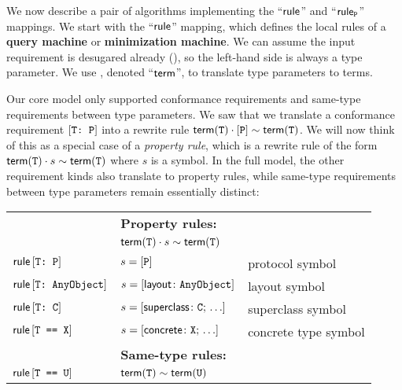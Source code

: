 \documentclass[../generics]{subfiles}
\begin{document}
We now describe a pair of algorithms implementing the ``$\mathsf{rule}$'' and ``$\mathsf{rule}_{\texttt{P}}$'' mappings. We start with the ``$\mathsf{rule}$'' mapping, which defines the local rules of a \textbf{query machine} or \textbf{minimization machine}. We can assume the input requirement is desugared already (), so the left-hand side is always a type parameter. We use , denoted ``$\mathsf{term}$'', to translate type parameters to terms.

Our core model only supported conformance requirements and same-type requirements between type parameters. We saw that we translate a conformance requirement $[\texttt{T:~P}]$ into a rewrite rule $\mathsf{term}(\texttt{T}) \cdot [\texttt{P}] \sim \mathsf{term}(\texttt{T})$. We will now think of this as a special case of a \emph{property rule}, which is a rewrite rule of the form $\mathsf{term}(\texttt{T}) \cdot s \sim \mathsf{term}(\texttt{T})$ where $s$ is a symbol. In the full model, the other requirement kinds also translate to property rules, while same-type requirements between type parameters remain essentially distinct:
\begin{center}
\begin{tabular}{lll}
\toprule
&\textbf{Property rules:}&\\
&$\mathsf{term}(\texttt{T}) \cdot s \sim \mathsf{term}(\texttt{T})$&\\
\midrule
$\mathsf{rule}\, [\texttt{T:~P}]$ & $s=[\texttt{P}]$&protocol symbol\\
$\mathsf{rule}\, [\texttt{T:~AnyObject}]$ & $s=[\mathsf{layout}\colon\texttt{AnyObject}]$&layout symbol\\
$\mathsf{rule}\, [\texttt{T:~C}]$ & $s=[\mathsf{superclass}\colon \texttt{C};\, \ldots]$&superclass symbol\\
$\mathsf{rule}\, [\texttt{T == X}]$ & $s=[\mathsf{concrete}\colon \texttt{X};\, \ldots]$&concrete type symbol\\
\midrule
&\textbf{Same-type rules:}&\\
$\mathsf{rule}\, [\texttt{T == U}]$ & $\mathsf{term}(\texttt{T})\sim\mathsf{term}(\texttt{U})$&\\
\bottomrule
\end{tabular}
\end{center}

\smallskip
\end{document}
